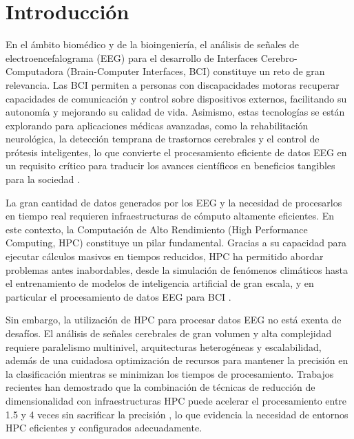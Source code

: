 \chapter{Introducción}\label{cap:introduccion}



En el ámbito biomédico y de la bioingeniería, el análisis de señales de electroencefalograma (EEG) para el desarrollo de Interfaces Cerebro-Computadora (Brain-Computer Interfaces, BCI) constituye un reto de gran relevancia. Las BCI permiten a personas con discapacidades motoras recuperar capacidades de comunicación y control sobre dispositivos externos, facilitando su autonomía y mejorando su calidad de vida. Asimismo, estas tecnologías se están explorando para aplicaciones médicas avanzadas, como la rehabilitación neurológica, la detección temprana de trastornos cerebrales y el control de prótesis inteligentes, lo que convierte el procesamiento eficiente de datos EEG en un requisito crítico para traducir los avances científicos en beneficios tangibles para la sociedad \cite{mcfarland2017eeg, Lotte2015ElectroencephalographyB}.

La gran cantidad de datos generados por los EEG y la necesidad de procesarlos en tiempo real requieren infraestructuras de cómputo altamente eficientes. En este contexto, la Computación de Alto Rendimiento (High Performance Computing, HPC) constituye un pilar fundamental. Gracias a su capacidad para ejecutar cálculos masivos en tiempos reducidos, HPC ha permitido abordar problemas antes inabordables, desde la simulación de fenómenos climáticos hasta el entrenamiento de modelos de inteligencia artificial de gran escala, y en particular el procesamiento de datos EEG para BCI \cite{2025HighPerformanceCF}.

Sin embargo, la utilización de HPC para procesar datos EEG no está exenta de desafíos. El análisis de señales cerebrales de gran volumen y alta complejidad requiere paralelismo multinivel, arquitecturas heterogéneas y escalabilidad, además de una cuidadosa optimización de recursos para mantener la precisión en la clasificación mientras se minimizan los tiempos de procesamiento. Trabajos recientes han demostrado que la combinación de técnicas de reducción de dimensionalidad con infraestructuras HPC puede acelerar el procesamiento entre 1.5 y 4 veces sin sacrificar la precisión \cite{mcfarland2017eeg, Lotte2015ElectroencephalographyB, 2025HighPerformanceCF}, lo que evidencia la necesidad de entornos HPC eficientes y configurados adecuadamente.


